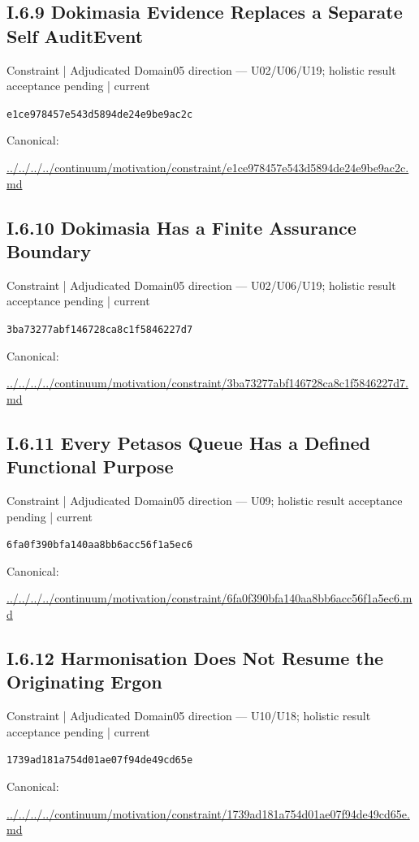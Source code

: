 \documentclass[10pt,a4paper]{article}
\begin{document}
\subsection*{I.6.9 Dokimasia Evidence Replaces a Separate Self AuditEvent}
\label{element-e1ce978457e543d5894de24e9be9ac2c}
{\small Constraint | Adjudicated Domain05 direction — U02/U06/U19; holistic result acceptance pending | current}\par
\texttt{e1ce978457e543d5894de24e9be9ac2c}\par
Canonical: \par
{\footnotesize\url{../../../../continuum/motivation/constraint/e1ce978457e543d5894de24e9be9ac2c.md}}\par
\subsection*{I.6.10 Dokimasia Has a Finite Assurance Boundary}
\label{element-3ba73277abf146728ca8c1f5846227d7}
{\small Constraint | Adjudicated Domain05 direction — U02/U06/U19; holistic result acceptance pending | current}\par
\texttt{3ba73277abf146728ca8c1f5846227d7}\par
Canonical: \par
{\footnotesize\url{../../../../continuum/motivation/constraint/3ba73277abf146728ca8c1f5846227d7.md}}\par
\subsection*{I.6.11 Every Petasos Queue Has a Defined Functional Purpose}
\label{element-6fa0f390bfa140aa8bb6acc56f1a5ec6}
{\small Constraint | Adjudicated Domain05 direction — U09; holistic result acceptance pending | current}\par
\texttt{6fa0f390bfa140aa8bb6acc56f1a5ec6}\par
Canonical: \par
{\footnotesize\url{../../../../continuum/motivation/constraint/6fa0f390bfa140aa8bb6acc56f1a5ec6.md}}\par
\subsection*{I.6.12 Harmonisation Does Not Resume the Originating Ergon}
\label{element-1739ad181a754d01ae07f94de49cd65e}
{\small Constraint | Adjudicated Domain05 direction — U10/U18; holistic result acceptance pending | current}\par
\texttt{1739ad181a754d01ae07f94de49cd65e}\par
Canonical: \par
{\footnotesize\url{../../../../continuum/motivation/constraint/1739ad181a754d01ae07f94de49cd65e.md}}\par
\end{document}
